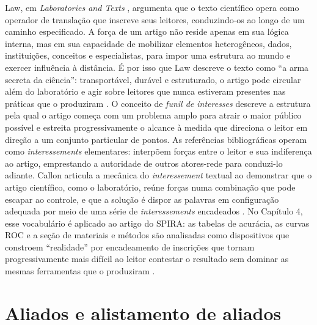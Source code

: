 \begin{description}
Law, em \textit{Laboratories and Texts} \parencite{Law1986Laboratories}, argumenta que o texto científico opera como operador de translação que inscreve seus leitores, conduzindo-os ao longo de um caminho especificado. A força de um artigo não reside apenas em sua lógica interna, mas em sua capacidade de mobilizar elementos heterogêneos, dados, instituições, conceitos e especialistas, para impor uma estrutura ao mundo e exercer influência à distância. É por isso que Law descreve o texto como ``a arma secreta da ciência'': transportável, durável e estruturado, o artigo pode circular além do laboratório e agir sobre leitores que nunca estiveram presentes nas práticas que o produziram \parencite{Law1986Laboratories}. O conceito de \textit{funil de interesses} descreve a estrutura pela qual o artigo começa com um problema amplo para atrair o maior público possível e estreita progressivamente o alcance à medida que direciona o leitor em direção a um conjunto particular de pontos. As referências bibliográficas operam como \textit{interessements} elementares: interpõem forças entre o leitor e sua indiferença ao artigo, emprestando a autoridade de outros atores-rede para conduzi-lo adiante. Callon articula a mecânica do \textit{interessement} textual ao demonstrar que o artigo científico, como o laboratório, reúne forças numa combinação que pode escapar ao controle, e que a solução é dispor as palavras em configuração adequada por meio de uma série de \textit{interessements} encadeados \parencite[pp.~71--72]{Callon1986Mapping}. No Capítulo 4, esse vocabulário é aplicado ao artigo do SPIRA: as tabelas de acurácia, as curvas ROC e a seção de materiais e métodos são analisadas como dispositivos que constroem ``realidade'' por encadeamento de inscrições que tornam progressivamente mais difícil ao leitor contestar o resultado sem dominar as mesmas ferramentas que o produziram \parencite{Law1986Laboratories,Callon1986Mapping}.

\bigskip

\section*{Aliados e alistamento de aliados}


\end{description}
